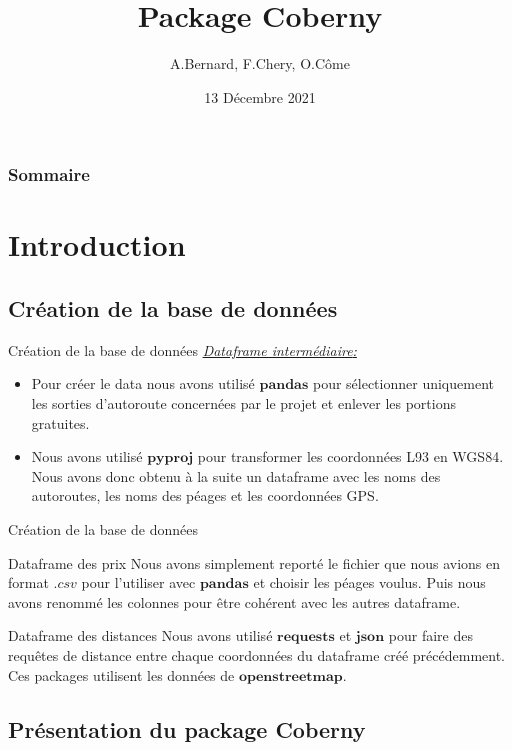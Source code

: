 \documentclass{beamer}
\title{Package Coberny}
\author{A.Bernard, F.Chery, O.Côme}\institute{Faculté des sciences de Montpellier}
\date{13 Décembre 2021}
\newcommand{\TextSoulign}[3]{\emph{\textcolor{#1}{\underline{#2\textcolor{black}{#3}}}}}
\begin{document}
\begin{frame}
\titlepage
\end{frame}

\begin{frame}
  \frametitle{Sommaire}
  \tableofcontents
\end{frame}

\section{Introduction}
\subsection{Création de la base de données}

\begin{frame}[fragile]{Création de la base de données}
\TextSoulign{amber}{Dataframe intermédiaire} : \newline
\begin{itemize}
\item Pour créer le data nous avons utilisé $\textbf{pandas}$ pour sélectionner uniquement les sorties d'autoroute concernées par le projet et enlever les portions gratuites.  
\item Nous avons utilisé $\textbf{pyproj}$ pour transformer les coordonnées L93 en WGS84. Nous avons donc obtenu à la suite un dataframe avec les noms des autoroutes, les noms des péages et les coordonnées GPS.
\end{itemize}
\end{frame}


\begin{frame}[fragile]{Création de la base de données}
\begin{block}{Dataframe des prix}
Nous avons simplement reporté le fichier que nous avions en format $\textit{.csv}$ pour l'utiliser avec $\textbf{pandas}$ et choisir les péages voulus. Puis nous avons renommé les colonnes pour être cohérent avec les autres dataframe.
\end{block}
\begin{block}{Dataframe des distances}
Nous avons utilisé $\textbf{requests}$ et $\textbf{json}$ pour faire des requêtes de distance entre chaque coordonnées du dataframe créé précédemment. Ces packages utilisent les données de $\textbf{openstreetmap}$.
\end{block}
\end{frame}



\subsection{Présentation du package Coberny}
\end{document}
